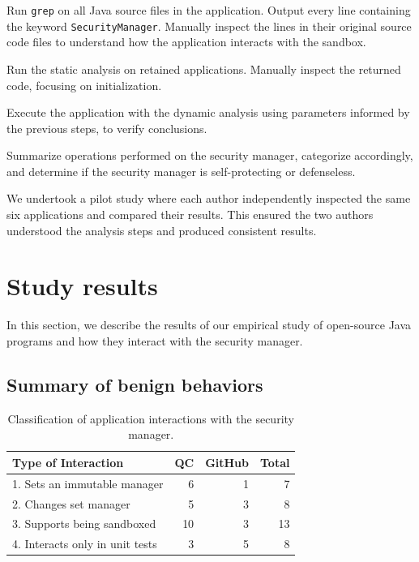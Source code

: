 \documentclass{sig-alternate}
\begin{document}
\begin{flushenum}\setlength{\parskip}{0pt}
  \setlength{\parsep}{0pt}
  \setlength{\itemsep}{0pt}
\item Run \texttt{grep} on all Java source files in the application.
Output every line containing the keyword \texttt{SecurityManager}.
Manually inspect the lines in their original source code files to understand
how the application interacts with the sandbox.
\item Run the static analysis on retained applications. Manually inspect the
  returned code, focusing on initialization. 
\item Execute the application with the dynamic analysis using parameters
  informed by the previous steps, 
to verify conclusions.
\item Summarize operations performed
on the security manager, categorize accordingly, and determine if the 
security manager is self-protecting or defenseless.
\end{flushenum}

We undertook a pilot study where each author
independently inspected the same six applications and compared their
results. This ensured the two authors understood the analysis steps 
and produced consistent results.


\section{Study results}\label{sec:Study-results}

In this section, we describe the results of our empirical study of open-source
Java programs and how they interact with the security manager. 

\subsection{Summary of benign behaviors}\label{sub:Evaluation-of-the-hypotheses}


\begin{table}
\caption{Classification of application
  interactions \label{tab:Classification-of-Application}
with the security manager.}
\begin{tabular}{lrrr}
\toprule 
Type of Interaction & QC & GitHub & Total\tabularnewline
\midrule
1. Sets an immutable manager & 6 & 1 & 7\tabularnewline
2. Changes set manager & 5 & 3 & 8\tabularnewline
3. Supports being sandboxed & 10 & 3 & 13\tabularnewline
4. Interacts only in unit tests & 3 & 5 & 8\tabularnewline
\bottomrule
\end{tabular}
\end{table}
\end{document}
